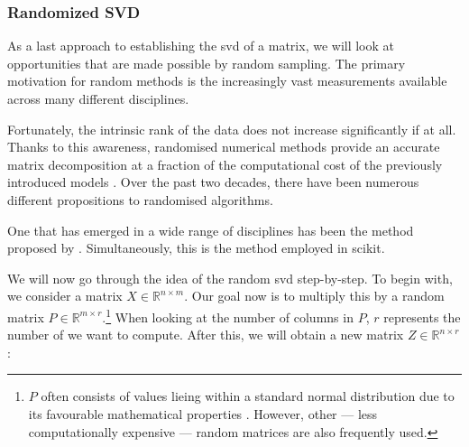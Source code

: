 \vspace*{20mm}


\clearpage


\subsubsection{Randomized SVD}


As a last approach to establishing the \acrlong{svd} of a matrix, we will look at opportunities that are made possible by random sampling. 
The primary motivation for random methods is the increasingly vast measurements available across many different disciplines.

Fortunately, the intrinsic rank of the data does not increase significantly if at all.
Thanks to this awareness, randomised numerical methods provide an accurate matrix decomposition at a fraction of the computational cost of the previously introduced models \cite{brunton2019data}.
Over the past two decades, there have been numerous different propositions to randomised algorithms.
\medskip

One that has emerged in a wide range of disciplines has been the method proposed by .
Simultaneously, this is the method employed in \gls{scikit}.
\bigskip


We will now go through the idea of the random \gls{svd} step-by-step.
To begin with, we consider a matrix $X \in \mathbb{R}^{n \times m}$.
Our goal now is to multiply this by a random matrix $P \in \mathbb{R}^{m \times r}$.\footnote{%
$P$ often consists of values lieing within a standard normal distribution due to its favourable mathematical properties \cite{brunton2019data}. %
However, other --- less computationally expensive --- random matrices are also frequently used.%
}
When looking at the number of columns in $P$, $r$ represents the number of  we want to compute.
After this, we will obtain a new matrix $Z \in \mathbb{R}^{n \times r}$:

